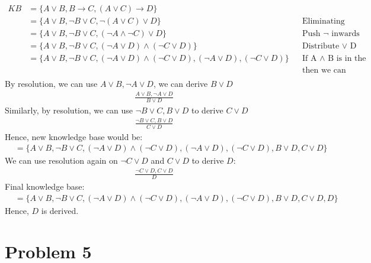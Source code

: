 \documentclass[12pt]{article}
\begin{document}
\begin{enumerate}[label=(\alph*)]
  \begin{align*}
  KB &= \{ A \lor B, B \rightarrow C, ( A \lor C) \rightarrow D \} \\
  &= \{ A \lor B, \neg B \lor  C, \neg ( A \lor C) \lor D \} && \text{Eliminating Implications} \\
  &= \{ A \lor B, \neg B \lor  C, ( \neg A \land \neg C) \lor D \} && \text{Push $\neg$ inwards} \\
  &= \{ A \lor B, \neg B \lor  C, ( \neg A \lor D ) \land ( \neg C \lor D ) \} && \text{Distribute $\lor$ D} \\
  &= \{ A \lor B, \neg B \lor  C, ( \neg A \lor D ) \land ( \neg C \lor D ), ( \neg A \lor D ), ( \neg C \lor D ) \} && \text{If A $\land$ B is in the knowledge base,} \\
  &   && \text{then we can derive both A and  B} \\
  \end{align*}
  By resolution, we can use $A \lor B, \neg A \lor D$, we can derive $B \lor D$
  \begin{align*}
  \frac{A \lor B, \neg A \lor D}{B \lor D}
  \end{align*}
  Similarly, by resolution, we can use $\neg B \lor C, B \lor D$ to derive $C \lor D$
  \begin{align*}
    \frac{\neg B \lor C, B \lor D}{C \lor D}
  \end{align*}
  Hence, new knowledge base would be:
  \begin{align*}
  &= \{ A \lor B, \neg B \lor  C, ( \neg A \lor D ) \land ( \neg C \lor D ), ( \neg A \lor D ), ( \neg C \lor D ), B \lor D, C \lor D \}
  \end{align*}
  We can use resolution again on $\neg C \lor D $ and $C \lor D$ to derive $D$:
  \begin{align*}
  \frac{\neg C \lor D , C \lor D}{D}
  \end{align*}
  Final knowledge base:
  \begin{align*}
&= \{ A \lor B, \neg B \lor  C, ( \neg A \lor D ) \land ( \neg C \lor D ), ( \neg A \lor D ), ( \neg C \lor D ), B \lor D, C \lor D, D \}
  \end{align*}
  Hence, $D$ is derived.
\end{enumerate}

\section*{Problem 5}
\end{document}
